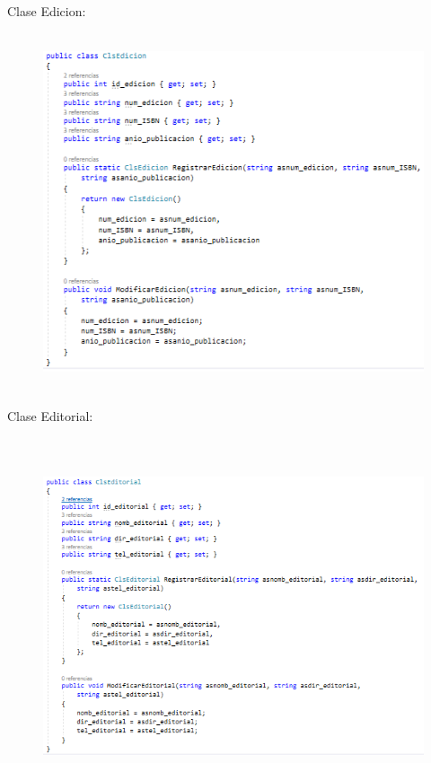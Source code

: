 \documentclass[12pt]{article}
\begin{document}
\begin{enumerate}[label*=\arabic*.]
\begin{enumerate}[label*=\arabic*.]
Clase Edicion:
\begin{figure}[H]
	\begin{Center}
		\includegraphics[width=4.91in,height=4.15in]{./media/3.png}
	\end{Center}
\end{figure}

\newpage
Clase Editorial:
\begin{figure}[H]
	\begin{Center}
		\includegraphics[width=4.91in,height=4.15in]{./media/4.png}
	\end{Center}
\end{figure}



\end{enumerate}
\end{enumerate}
\end{document}
